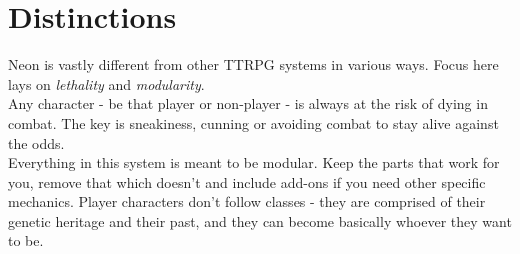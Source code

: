\documentclass[12pt,a4paper,openany]{book}
\begin{document}
	

	\chapter{Distinctions}
	Neon is vastly different from other TTRPG systems in various ways. Focus here lays on \emph{lethality} and \emph{modularity}.\\
	Any character - be that player or non-player - is always at the risk of dying in combat. The key is sneakiness, cunning or avoiding combat to stay alive against the odds.\\
	Everything in this system is meant to be modular. Keep the parts that work for you, remove that which doesn't and include add-ons if you need other specific mechanics. Player characters don't follow classes - they are comprised of their genetic heritage and their past, and they can become basically whoever they want to be.
\end{document}
